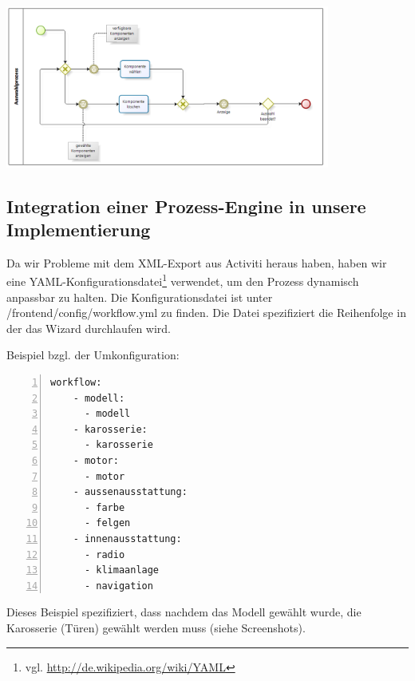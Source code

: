 \documentclass[a4paper,10pt]{article}
\begin{document}
\includegraphics[width=0.8\textwidth]{screenshots/auswahl2.png}
 
\subsection*{Integration einer Prozess-Engine in unsere Implementierung}

Da wir Probleme mit dem XML-Export aus Activiti heraus haben, haben wir eine YAML-Konfigurationsdatei\footnote{vgl. \url{http://de.wikipedia.org/wiki/YAML}} verwendet, um den Prozess dynamisch anpassbar zu halten.
Die Konfigurationsdatei ist unter /frontend/config/workflow.yml zu finden.
Die Datei spezifiziert die Reihenfolge in der das Wizard durchlaufen wird.
 
Beispiel bzgl. der Umkonfiguration:

\begin{lstlisting}[numbers=left]
  workflow:
    - modell: 
      - modell 
    - karosserie: 
      - karosserie
    - motor:
      - motor
    - aussenausstattung: 
      - farbe 
      - felgen
    - innenausstattung: 
      - radio 
      - klimaanlage
      - navigation
\end{lstlisting}

Dieses Beispiel spezifiziert, dass nachdem das Modell gewählt wurde, die Karosserie (Türen) gewählt werden muss (siehe Screenshots).
\end{document}
